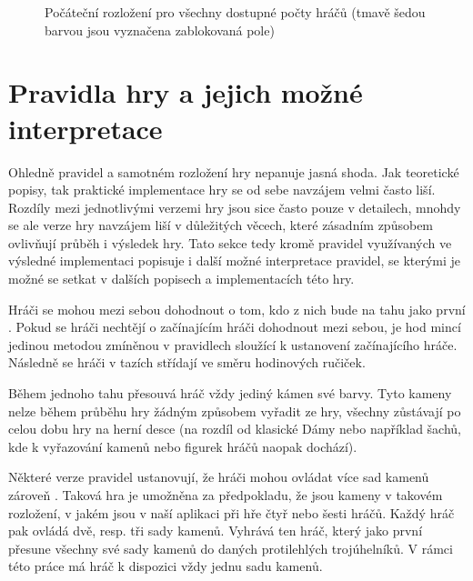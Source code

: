 \begin{figure}
{	}
	\hspace{3em} %
	\caption[Počáteční rozložení pro všechny dostupné počty hráčů]{Počáteční rozložení pro všechny dostupné počty hráčů (tmavě šedou barvou jsou vyznačena zablokovaná pole)}
	\label{fig:PocatecniRozlozeni}
\end{figure}

\section{Pravidla hry a jejich možné interpretace}
Ohledně pravidel a samotném rozložení hry nepanuje jasná shoda. Jak teoretické popisy, tak praktické implementace hry se od sebe navzájem velmi často liší. Rozdíly mezi jednotlivými verzemi hry jsou sice často pouze v detailech, mnohdy se ale verze hry navzájem liší v důležitých věcech, které zásadním způsobem ovlivňují průběh i výsledek hry. Tato sekce tedy kromě pravidel využívaných ve výsledné implementaci popisuje i další možné interpretace pravidel, se kterými je možné se setkat v dalších popisech a implementacích této hry.

Hráči se mohou mezi sebou dohodnout o tom, kdo z nich bude na tahu jako první \cite{pravidla2}. Pokud se hráči nechtějí o začínajícím hráči dohodnout mezi sebou, je hod mincí jedinou metodou zmíněnou v pravidlech sloužící k ustanovení začínajícího hráče. Následně se hráči v tazích střídají ve směru hodinových ručiček.

Během jednoho tahu přesouvá hráč vždy jediný kámen své barvy. Tyto kameny nelze během průběhu hry žádným způsobem vyřadit ze hry, všechny zůstávají po celou dobu hry na herní desce (na rozdíl od klasické Dámy nebo například šachů, kde k vyřazování kamenů nebo figurek hráčů naopak dochází).

Některé verze pravidel ustanovují, že hráči mohou ovládat více sad kamenů zároveň \cite{pravidla3}. Taková hra je umožněna za předpokladu, že jsou kameny v takovém rozložení, v jakém jsou v naší aplikaci při hře čtyř nebo šesti hráčů. Každý hráč pak ovládá dvě, resp. tři sady kamenů. Vyhrává ten hráč, který jako první přesune všechny své sady kamenů do daných protilehlých trojúhelníků. V rámci této práce má hráč k dispozici vždy jednu sadu kamenů.


